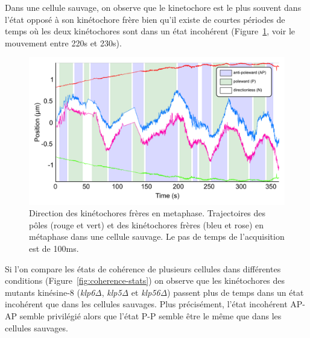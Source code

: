 \documentclass[12pt,a4paper,twoside,openright]{book}
\begin{document}
Dans une cellule sauvage, on observe que le kinetochore est le plus
souvent dans l'état opposé à son kinétochore frère bien qu'il existe de
courtes périodes de temps où les deux kinétochores sont dans un état
incohérent (Figure~\ref{fig:coherence_kymo}, voir le mouvement entre
220s et 230s).

\begin{figure}[htbp]
\centering
\includegraphics{figures/results/imaging/coherence_kymo.png}
\caption[Direction des kinétochores frères en metaphase.]{\label{fig:coherence_kymo}Direction
des kinétochores frères en metaphase. Trajectoires des pôles (rouge et
vert) et des kinétochores frères (bleu et rose) en métaphase dans une
cellule sauvage. Le pas de temps de l'acquisition est de 100ms.}
\end{figure}

Si l'on compare les états de cohérence de plusieurs cellules dans
différentes conditions (Figure~\ref{fig:coherence-stats}) on observe que
les kinétochores des mutants kinésine-8 (\emph{klp6Δ}, \emph{klp5Δ} et
\emph{klp56Δ}) passent plus de temps dans un état incohérent que dans
les cellules sauvages. Plus précisément, l'état incohérent AP-AP semble
privilégié alors que l'état P-P semble être le même que dans les
cellules sauvages.
\end{document}
